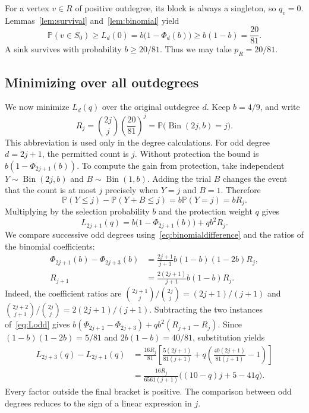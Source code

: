 \documentclass[10pt,a4paper]{article}
\DeclareMathOperator{\Bin}{Bin}
\newcommand{\Pp}{\mathbb P}
\begin{document}
For a vertex \(v\in R\) of positive outdegree, its block is always a singleton, so \(q_v=0\). Lemmas~\ref{lem:survival} and~\ref{lem:binomial} yield
\[
\Pp(v\in S_0)\ge L_d(0)
=b\bigl(1-\Phi_d(b)\bigr)\ge b(1-b)=\frac{20}{81}.
\]
A sink survives with probability \(b\ge20/81\). Thus we may take \(p_R=20/81\).

\subsection{Minimizing over all outdegrees}\label{sec:degreemin}
We now minimize \(L_d(q)\) over the original outdegree \(d\). Keep \(b=4/9\), and write
\[
R_j=\binom{2j}{j}\left(\frac{20}{81}\right)^j
=\Pp\bigl(\Bin(2j,b)=j\bigr).
\]
This abbreviation is used only in the degree calculations. For odd degree \(d=2j+1\), the permitted count is \(j\). Without protection the bound is \(b(1-\Phi_{2j+1}(b))\). To compute the gain from protection, take independent \(Y\sim\Bin(2j,b)\) and \(B\sim\Bin(1,b)\). Adding the trial \(B\) changes the event that the count is at most \(j\) precisely when \(Y=j\) and \(B=1\). Therefore
\[
\Pp(Y\le j)-\Pp(Y+B\le j)=b\Pp(Y=j)=bR_j.
\]
Multiplying by the selection probability \(b\) and the protection weight \(q\) gives
\begin{equation}\label{eq:Lodd}
L_{2j+1}(q)=b\bigl(1-\Phi_{2j+1}(b)\bigr)+qb^2R_j.
\end{equation}
We compare successive odd degrees using~\eqref{eq:binomialdifference} and the ratios of the binomial coefficients:
\[
\begin{aligned}
\Phi_{2j+1}(b)-\Phi_{2j+3}(b)
&=\frac{2j+1}{j+1}b(1-b)(1-2b)R_j,\\
R_{j+1}&=\frac{2(2j+1)}{j+1}b(1-b)R_j.
\end{aligned}
\]
Indeed, the coefficient ratios are \(\binom{2j+1}{j}/\binom{2j}{j}=(2j+1)/(j+1)\) and \(\binom{2j+2}{j+1}/\binom{2j}{j}=2(2j+1)/(j+1)\). Subtracting the two instances of~\eqref{eq:Lodd} gives
\(b(\Phi_{2j+1}-\Phi_{2j+3})+qb^2(R_{j+1}-R_j)\).
Since \((1-b)(1-2b)=5/81\) and \(2b(1-b)=40/81\), substitution yields
\begin{equation}\label{eq:recurrence}
\begin{aligned}
L_{2j+3}(q)-L_{2j+1}(q)
&=\frac{16R_j}{81}\left[\frac{5(2j+1)}{81(j+1)}
+q\left(\frac{40(2j+1)}{81(j+1)}-1\right)\right]\\
&=\frac{16R_j}{6561(j+1)}\bigl((10-q)j+5-41q\bigr).
\end{aligned}
\end{equation}
Every factor outside the final bracket is positive. The comparison between odd degrees reduces to the sign of a linear expression in \(j\).
\end{document}
